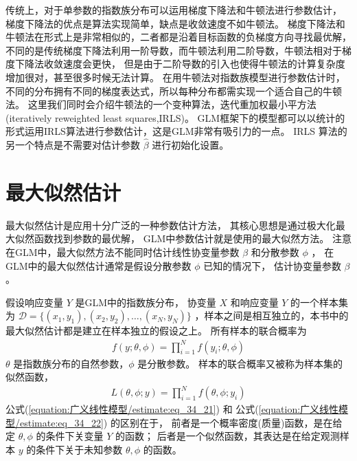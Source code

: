 \documentclass[letterpaper,10pt,english]{sphinxmanual}
\begin{document}
传统上，对于单参数的指数族分布可以运用梯度下降法和牛顿法进行参数估计，
梯度下降法的优点是算法实现简单，缺点是收敛速度不如牛顿法。
梯度下降法和牛顿法在形式上是非常相似的，二者都是沿着目标函数的负梯度方向寻找最优解，
不同的是传统梯度下降法利用一阶导数，而牛顿法利用二阶导数，牛顿法相对于梯度下降法收敛速度会更快，
但是由于二阶导数的引入也使得牛顿法的计算复杂度增加很对，甚至很多时候无法计算。
在用牛顿法对指数族模型进行参数估计时，不同的分布拥有不同的梯度表达式，所以每种分布都需实现一个适合自己的牛顿法。
这里我们同时会介绍牛顿法的一个变种算法，迭代重加权最小平方法(iteratively reweighted least squares,IRLS)。
GLM框架下的模型都可以以统计的形式运用IRLS算法进行参数估计，这是GLM非常有吸引力的一点。
IRLS 算法的另一个特点是不需要对估计参数 \(\hat{\beta}\) 进行初始化设置。


\section{最大似然估计}
\label{\detokenize{_u5e7f_u4e49_u7ebf_u6027_u6a21_u578b/estimate:ch-glm-estimate}}\label{\detokenize{_u5e7f_u4e49_u7ebf_u6027_u6a21_u578b/estimate:id2}}
最大似然估计是应用十分广泛的一种参数估计方法，
其核心思想是通过极大化最大似然函数找到参数的最优解，
GLM中参数估计就是使用的最大似然方法。
注意在GLM中，最大似然方法不能同时估计线性协变量参数 \(\beta\) 和分散参数
\(\phi\) ，
在GLM中的最大似然估计通常是假设分散参数 \(\phi\) 已知的情况下，
估计协变量参数 \(\beta\) 。

假设响应变量 \(Y\) 是GLM中的指数族分布，
协变量 \(X\) 和响应变量 \(Y\) 的一个样本集为 \(\mathcal{D}=\{(x_1,y_1),(x_2,y_2),\dots,(x_N,y_N)\}\)
，样本之间是相互独立的，本书中的最大似然估计都是建立在样本独立的假设之上。
所有样本的联合概率为
\begin{equation}\label{equation:广义线性模型/estimate:eq_34_21}
\begin{split}f(y;\theta,\phi)=\prod_{i=1}^N f(y_i;\theta,\phi)\end{split}
\end{equation}
\(\theta\) 是指数族分布的自然参数，\(\phi\)
是分散参数。
样本的联合概率又被称为样本集的似然函数，
\begin{equation}\label{equation:广义线性模型/estimate:eq_34_22}
\begin{split}L(\theta,\phi;y)=\prod_{i=1}^N f(\theta,\phi;y_i)\end{split}
\end{equation}
公式(\ref{equation:广义线性模型/estimate:eq_34_21}) 和 公式(\ref{equation:广义线性模型/estimate:eq_34_22}) 的区别在于，
前者是一个概率密度(质量)函数，是在给定 \(\theta,\phi\) 的条件下关变量 \(Y\) 的函数；
后者是一个似然函数，其表达是在给定观测样本 \(y\) 的条件下关于未知参数 \(\theta,\phi\) 的函数。
\end{document}
